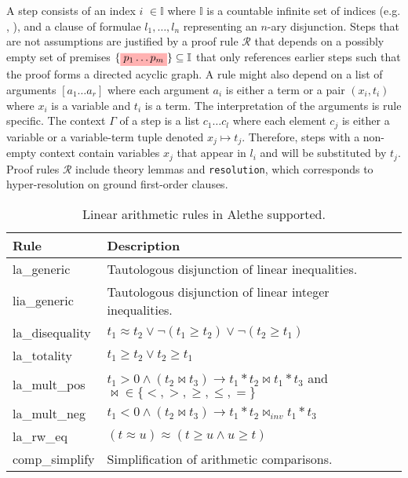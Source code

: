 \vspace{0.3em}

\vspace{0.3em}

\medskip

A step %
consists of an index \colorbox{indexClr!30}{$i$} $\in \mathbb{I}$ where $\mathbb{I}$ is a countable infinite set of indices (e.g. , ), and a clause of formulae \colorbox{green!30}{$l_1, \dots, l_n$} representing an $n$-ary disjunction. Steps that are not assumptions are justified by a proof rule \colorbox{purple!30}{$\mathcal{R}$} that depends on a possibly empty set of premises $\{\colorbox{red!30}{$p_1 \dots  p_m$}\} \subseteq \mathbb{I}$ that only references earlier steps such that the proof forms
a directed acyclic graph. A rule might also depend on a list of arguments \colorbox{orange!30}{$[a_1 \dots a_r]$} where each argument $a_i$ is either a term or a pair $(x_i, t_i)$ where $x_i$ is a variable and $t_i$ is a term. The interpretation of the arguments is rule specific. The context \colorbox{blue!30}{$\Gamma$} of a step is a list $c_1 \dots c_l $ where each element $c_j$ is either a variable or a variable-term tuple denoted $x_j \mapsto t_j$. Therefore, steps with a non-empty context contain variables $x_j$ that appear in \colorbox{green!30}{$l_i$} and will be substituted by $t_j$. Proof rules \colorbox{purple!30}{$\mathcal{R}$} include theory lemmas and \texttt{resolution}, which corresponds to hyper-resolution on ground first-order clauses. 


\begin{table}[]
    \centering
    \begin{tabular}{ll}
    Rule & Description \\ \hline
    la\_generic & Tautologous disjunction of linear inequalities. \\
    lia\_generic & Tautologous disjunction of linear integer inequalities. \\
    la\_disequality & $t_1 \approx t_2 \lor \neg (t_1 \geq t_2) \lor \neg (t_2 \geq t_1)$ \\
    la\_totality & $t_1 \geq t_2 \lor t_2 \geq t_1$ \\
    la\_mult\_pos & $t_1 > 0 \land (t_2 \bowtie t_3) \rightarrow t_1 * t_2 \bowtie t_1 * t_3$ and $\bowtie \in \{<, >, \geq, \leq, =\}$ \\
    la\_mult\_neg & $t_1 < 0 \land (t_2 \bowtie t_3) \rightarrow t_1 * t_2 \bowtie_{inv} t_1 * t_3$ \\
    la\_rw\_eq & $(t \approx u) \approx (t \geq u \land u \geq t)$ \\
    comp\_simplify & Simplification of arithmetic comparisons. \\
    \end{tabular}
    \caption{Linear arithmetic rules in Alethe supported.}
    \label{table:linear-arith-rules}
\end{table}

